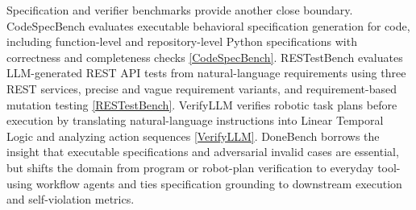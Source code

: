 Specification and verifier benchmarks provide another close boundary. CodeSpecBench evaluates executable behavioral specification generation for code, including function-level and repository-level Python specifications with correctness and completeness checks \href{https://arxiv.org/abs/2604.12268}{[CodeSpecBench]}. RESTestBench evaluates LLM-generated REST API tests from natural-language requirements using three REST services, precise and vague requirement variants, and requirement-based mutation testing \href{https://arxiv.org/abs/2604.25862}{[RESTestBench]}. VerifyLLM verifies robotic task plans before execution by translating natural-language instructions into Linear Temporal Logic and analyzing action sequences \href{https://arxiv.org/abs/2507.05118}{[VerifyLLM]}. DoneBench borrows the insight that executable specifications and adversarial invalid cases are essential, but shifts the domain from program or robot-plan verification to everyday tool-using workflow agents and ties specification grounding to downstream execution and self-violation metrics.
